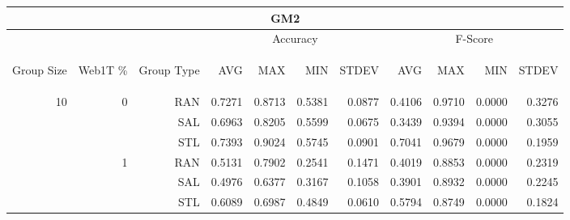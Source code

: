 \begin{center}
\begin{table}[htbp]
\begin{tabular}{ | r | r | r | r | r | r | r | r | r | r | r |}
\hline
\multicolumn{11}{|c|}{GM2}\\
\hline
 & & & \multicolumn{4}{|c|}{Accuracy} & \multicolumn{4}{|c|}{F-Score}\\ \cline{4-11}
\begin{sideways}Group Size\end{sideways} & \begin{sideways}Web1T \%\end{sideways} & \begin{sideways}Group Type\end{sideways} & \begin{sideways}AVG\end{sideways} & \begin{sideways}MAX\end{sideways} & \begin{sideways}MIN\end{sideways} & \begin{sideways}STDEV\end{sideways} & \begin{sideways}AVG\end{sideways} & \begin{sideways}MAX\end{sideways} & \begin{sideways}MIN\end{sideways} & \begin{sideways}STDEV\end{sideways}\\
\hline
\multirow{18}{*}{10}
 & \multirow{3}{*}{0} & RAN & 0.7271 & 0.8713 & 0.5381 & 0.0877 & 0.4106 & 0.9710 & 0.0000 & 0.3276\\ \cline{3-11}
 &   & SAL & 0.6963 & 0.8205 & 0.5599 & 0.0675 & 0.3439 & 0.9394 & 0.0000 & 0.3055\\ \cline{3-11}
 &   & STL & 0.7393 & 0.9024 & 0.5745 & 0.0901 & 0.7041 & 0.9679 & 0.0000 & 0.1959\\ \cline{2-11}
 & \multirow{3}{*}{1} & RAN & 0.5131 & 0.7902 & 0.2541 & 0.1471 & 0.4019 & 0.8853 & 0.0000 & 0.2319\\ \cline{3-11}
 &   & SAL & 0.4976 & 0.6377 & 0.3167 & 0.1058 & 0.3901 & 0.8932 & 0.0000 & 0.2245\\ \cline{3-11}
 &   & STL & 0.6089 & 0.6987 & 0.4849 & 0.0610 & 0.5794 & 0.8749 & 0.0000 & 0.1824\\ \cline{2-11}

\end{tabular}
\end{table}
\end{center}
